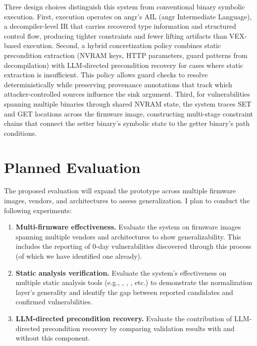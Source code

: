 Three design choices distinguish this system from conventional binary symbolic execution.
First, execution operates on angr's AIL (angr Intermediate Language), a decompiler-level IR that carries recovered type information and structured control flow, producing tighter constraints and fewer lifting artifacts than VEX-based execution.
Second, a hybrid concretization policy combines static precondition extraction (NVRAM keys, HTTP parameters, guard patterns from decompilation) with LLM-directed precondition recovery for cases where static extraction is insufficient.
This policy allows guard checks to resolve deterministically while preserving provenance annotations that track which attacker-controlled sources influence the sink argument.
Third, for vulnerabilities spanning multiple binaries through shared NVRAM state, the system traces SET and GET locations across the firmware image, constructing multi-stage constraint chains that connect the setter binary's symbolic state to the getter binary's path conditions.

\section{Planned Evaluation}
\label{sec:proposed-evaluation}

The proposed evaluation will expand the prototype across multiple firmware images, vendors, and architectures to assess generalization.
I plan to conduct the following experiments:

\begin{enumerate}[nosep]
  \item \textbf{Multi-firmware effectiveness.} Evaluate the system on firmware images spanning multiple vendors and architectures to show generalizability. This includes the reporting of 0-day vulnerabilities discovered through this process (of which we have identified one already).
  \item \textbf{Static analysis verification.} Evaluate the system's effectiveness on multiple static analysis tools (e.g., \mango, \satc, \karonte, etc.) to demonstrate the normalization layer's generality and identify the gap between reported candidates and confirmed vulnerabilities.
  \item \textbf{LLM-directed precondition recovery.} Evaluate the contribution of LLM-directed precondition recovery by comparing validation results with and without this component.
\end{enumerate}
